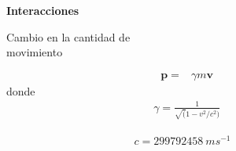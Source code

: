 \documentclass[%
xcolor=pdftex,dvipsnames,table%
]{beamer}
\begin{document}
{
\begin{frame}[plain]
  \begin{flushleft}
\textbf{Interacciones}

Cambio en la cantidad de\\
 movimiento

 \begin{align*}
   \mathbf{p}=&\gamma m \mathbf{v} &&&&
 \end{align*}
donde
\begin{align*}
  \gamma=\frac{1}{\sqrt(1-v^2/c^2)} &&&&
\end{align*}

\begin{align*}
  c=\SI{299 792 458}{ms^{-1}} & &&&&
\end{align*}
  \end{flushleft}
\end{frame}
}
\end{document}

